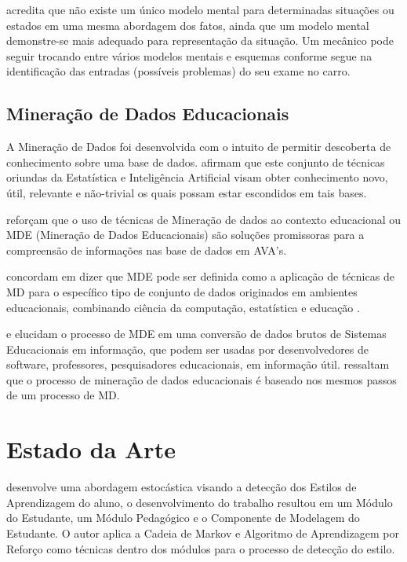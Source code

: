 \documentclass[12pt]{article}
\begin{document}
\cite{Moreira1996} acredita que não existe um único modelo mental para determinadas situações ou estados em uma mesma abordagem dos fatos, ainda que um modelo mental demonstre-se mais adequado para representação da situação. Um mecânico pode seguir trocando entre vários modelos mentais e esquemas conforme segue na identificação das entradas (possíveis problemas) do seu exame no carro.

\subsection{Mineração de Dados Educacionais}

A Mineração de Dados foi desenvolvida com o intuito de permitir descoberta de conhecimento sobre uma base de dados. \cite{Goldschmidt_Passos_2005} afirmam que este conjunto de técnicas oriundas da Estatística e Inteligência Artificial visam obter conhecimento novo, útil, relevante e não-trivial os quais possam estar escondidos em tais bases.

\cite{Leite_et_al_2016} reforçam que o uso de técnicas de Mineração de dados ao contexto educacional ou MDE (Mineração de Dados Educacionais) são soluções promissoras para a compreensão de informações nas base de dados em AVA's.

\cite{Romero_Ventura_2013} concordam em dizer que MDE pode ser definida como a aplicação de técnicas de MD para o específico tipo de conjunto de dados originados em ambientes educacionais, combinando ciência da computação, estatística e educação .

\cite{Garcia_et_al_2011} e \cite{Santos2016} elucidam o processo de MDE em uma conversão de dados brutos de Sistemas Educacionais em informação, que podem ser usadas por desenvolvedores de software, professores, pesquisadores educacionais, em informação útil. \cite{Garcia_et_al_2011} ressaltam que o processo de mineração de dados educacionais é baseado nos mesmos passos de um processo de MD.

\section{Estado da Arte}

\cite{Dorca2012} desenvolve uma abordagem estocástica visando a detecção dos Estilos de Aprendizagem do aluno, o desenvolvimento do trabalho resultou em um Módulo do Estudante, um Módulo Pedagógico e o Componente de Modelagem do Estudante. O autor aplica a Cadeia de Markov e Algoritmo de Aprendizagem por Reforço como técnicas dentro dos módulos para o processo de detecção do estilo.
\end{document}
